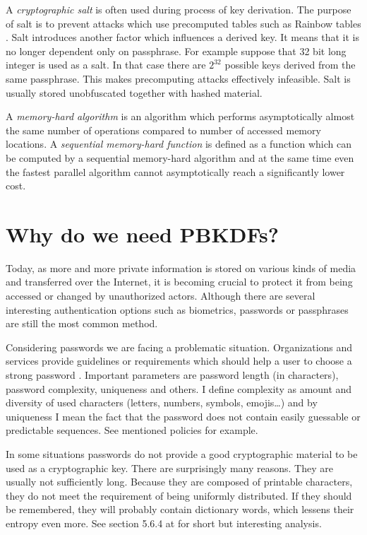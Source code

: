 \documentclass[nolof]{fithesis3}
\begin{document}
A \emph{cryptographic salt} is often used during process of key derivation. The purpose of salt is to prevent attacks which use precomputed tables such as Rainbow tables \parencite{rainbowtables}. Salt introduces another factor which influences a derived key. It means that it is no longer dependent only on passphrase. For example suppose that 32 bit long integer is used as a salt. In that case there are \(2^{32}\) possible keys derived from the same passphrase. This makes precomputing attacks effectively infeasible. Salt is usually stored unobfuscated together with hashed material.

A \emph{memory-hard algorithm} is an algorithm which performs asymptotically almost the same number of operations compared to number of accessed memory locations. A \emph{sequential memory-hard function} is defined as a function which can be computed by a sequential memory-hard algorithm and at the same time even the fastest parallel algorithm cannot asymptotically reach a significantly lower cost.

\section{Why do we need PBKDFs?}
\label{whypbkdfs}
Today, as more and more private information is stored on various kinds of media and transferred over the Internet, it is becoming crucial to protect it from being accessed or changed by unauthorized actors. Although there are several interesting authentication options such as biometrics, passwords or passphrases are still the most common method.

Considering passwords we are facing a problematic situation. Organizations and services provide guidelines or requirements which should help a user to choose a strong password \parencites{nistpasswords}{sanspasswordguidelines}. Important parameters are password length (in characters), password complexity, uniqueness and others. I define complexity as amount and diversity of used characters (letters, numbers, symbols, emojis\dots) and by uniqueness I mean the fact that the password does not contain easily guessable or predictable sequences. See mentioned policies for example.

In some situations passwords  do not provide a good cryptographic material to be used as a cryptographic key. There are surprisingly many reasons. They are usually not sufficiently long. Because they are composed of printable characters, they do not meet the requirement of being uniformly distributed. If they should be remembered, they will probably contain dictionary words, which lessens their entropy even more. See section 5.6.4 at \parencite{itmc14} for short but interesting analysis.
\end{document}
